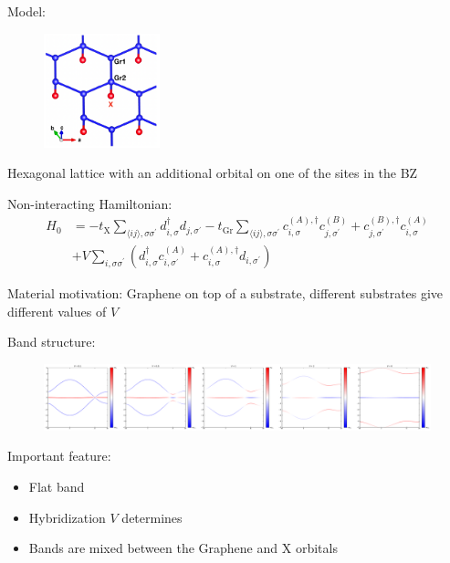 \documentclass[aspectratio=169]{beamer}
\begin{document}
\begin{frame}
	
	Model:
	\begin{figure}
		\includegraphics[width=0.3\textwidth]{figs/EG-X structure}
	\end{figure}
	Hexagonal lattice with an additional orbital on one of the sites in the BZ
	
	Non-interacting Hamiltonian:
	\begin{align}
		H_0 &= -t_{\mathrm{X}} \sum_{\langle ij \rangle, \sigma \sigma^{\prime}} d_{i, \sigma}^{\dagger} d_{j, \sigma^{\prime}}
		-t_{\mathrm{Gr}} \sum_{\langle ij \rangle, \sigma \sigma^{\prime}}
		c_{i, \sigma}^{(A), \dagger} c_{j, \sigma^{\prime}}^{(B)} +
		c_{j, \sigma^{\prime}}^{(B), \dagger} c_{i, \sigma}^{(A)} \\
		&+ V \sum_{i, \sigma \sigma^{\prime}} \left(
		d_{i, \sigma}^{\dagger} c_{i, \sigma^{\prime}}^{(A)} +
		c_{i, \sigma}^{(A), \dagger} d_{i, \sigma^{\prime}}
		\right)
		\label{eq:EG-X model Hamiltonian non-interacting}
	\end{align}
	
	Material motivation: Graphene on top of a substrate, different substrates give different values of \(V\)
\end{frame}

\begin{frame}
	
	Band structure:
	
	\begin{figure}
		\includegraphics[width=\textwidth]{figs/EG_X bands_tGr_1_tX_0.01}
	\end{figure}

	Important feature:
	\begin{itemize}
		\item Flat band
		\item Hybridization \(V\) determines 
		\item Bands are mixed between the Graphene and X orbitals
	\end{itemize}
\end{frame}
\end{document}
